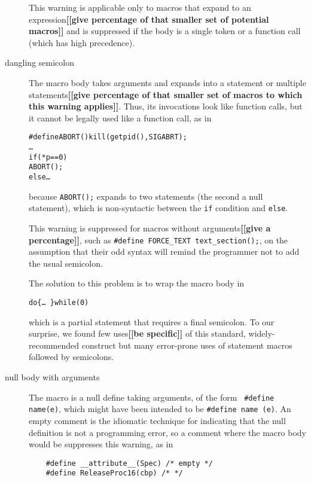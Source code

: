 \documentclass[10pt]{article}
\newcommand{\comment}[1]{\textbf{[[#1]]}}
\begin{document}
\begin{description}
        This warning is applicable only to macros that expand to an
        expression\comment{give percentage of that smaller set of potential
        macros} and is suppressed if the body is a single token or a
        function call (which has high precedence).

\item[dangling semicolon]\label{item:swallow-semicolon}
        The macro body takes arguments and expands into a statement or
        multiple statements\comment{give percentage of that smaller set of
        macros to which this warning applies}.  Thus, its invocations look like function
        calls, but it cannot be legally used like a function call, as in
\begin{alltt}
    #define ABORT() kill(getpid(),SIGABRT);
    \ldots
    if (*p == 0)
      ABORT();
    else \ldots
\end{alltt}
        because {\tt ABORT();} expands to two statements (the second a null
        statement), which is non-syntactic between the {\tt if} condition and
        {\tt else}.
        
        This warning is suppressed for macros without
        arguments\comment{give a percentage}, such as
        {\tt \#define \verb|FORCE_TEXT| \verb|text_section|();}, on the
        assumption that their odd syntax will remind the programmer not to
        add the usual semicolon.

        The solution to this problem is to wrap the macro body in
\begin{alltt}
             do \verb|{| \ldots\ \verb|}| while (0)
\end{alltt}
        which is a partial statement that requires a final semicolon.  To
        our surprise, we found few uses\comment{be specific} of this standard, widely-recommended
        construct but many error-prone uses of statement macros followed by
        semicolons.

\item[null body with arguments]
        The macro is a null define taking arguments, of the form {\tt
        \#define name(e)},
        which might have been intended to be {\tt \#define name (e)}.
        An empty comment is the idiomatic technique for indicating that the
        null definition is not a programming error, so a comment where the macro
        body would be suppresses this warning, as in
\begin{verbatim}
    #define __attribute__(Spec) /* empty */
    #define ReleaseProc16(cbp) /* */
\end{verbatim}


\end{description}
\end{document}

